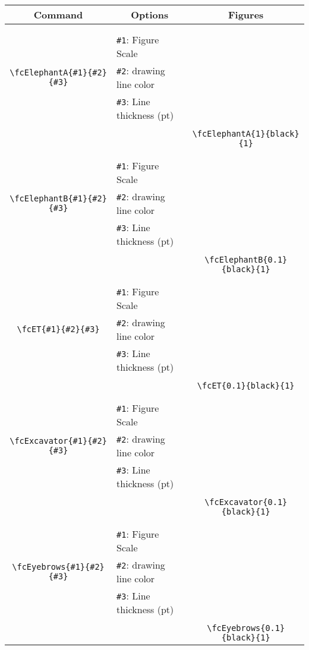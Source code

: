 \documentclass[x11names]{article}
\begin{document}
\begin{table}[H]\centering\begin{tabular}{|c|l|c|}\hline {\bf Command}& \multicolumn{1}{c|}{{\bf Options}} & {\bf Figures}\\  \hline	&&\multirow{5}{*}{\fcElephantA{1}{black}{1}}\\	&&\\	&\verb|#1|: Figure Scale &\\	\verb|\fcElephantA{#1}{#2}{#3}|&	\verb|#2|: drawing line color &\\	&\verb|#3|: Line thickness (pt) &\\ &&\\&&	\verb|\fcElephantA{1}{black}{1}|\\\hline 	
	&&\multirow{5}{*}{\fcElephantB{0.1}{black}{1}}\\	&&\\	&\verb|#1|: Figure Scale &\\	\verb|\fcElephantB{#1}{#2}{#3}|&	\verb|#2|: drawing line color &\\	&\verb|#3|: Line thickness (pt) &\\ &&\\&&	\verb|\fcElephantB{0.1}{black}{1}|\\\hline 	
	&&\multirow{5}{*}{\fcET{0.1}{black}{1}}\\	&&\\	&\verb|#1|: Figure Scale &\\	\verb|\fcET{#1}{#2}{#3}|&	\verb|#2|: drawing line color &\\	&\verb|#3|: Line thickness (pt) &\\ &&\\&&	\verb|\fcET{0.1}{black}{1}|\\\hline 	
	&&\multirow{5}{*}{\fcExcavator{0.1}{black}{1}}\\	&&\\	&\verb|#1|: Figure Scale &\\	\verb|\fcExcavator{#1}{#2}{#3}|&	\verb|#2|: drawing line color &\\	&\verb|#3|: Line thickness (pt) &\\ &&\\&&	\verb|\fcExcavator{0.1}{black}{1}|\\\hline 	
	&&\multirow{5}{*}{\fcEyebrows{0.1}{black}{1}}\\	&&\\	&\verb|#1|: Figure Scale &\\	\verb|\fcEyebrows{#1}{#2}{#3}|&	\verb|#2|: drawing line color &\\	&\verb|#3|: Line thickness (pt) &\\ &&\\&&	\verb|\fcEyebrows{0.1}{black}{1}|\\\hline 	

\end{tabular}
\end{table}
\end{document}
